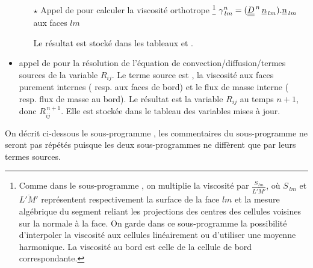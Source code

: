 \begin{itemize}
\begin{itemize}
\item [$\star$] Appel de  pour calculer la viscosité orthotrope
\footnote{Comme dans le sous-programme , on multiplie la viscosité par
$\displaystyle \frac{S_{\,lm}}{\overline{L'M'}}$, où $S_{\,lm}$ et
$\overline{L'M'}$ représentent respectivement la surface de la face $lm$ et la
mesure algébrique du segment reliant les projections des centres des cellules
voisines sur la normale à la face. On garde dans ce sous-programme  la possibilité d'interpoler la viscosité aux cellules linéairement ou d'utiliser une moyenne harmonique. La viscosité au bord est celle de la cellule de bord correspondante.}
$ \gamma^n_{\,lm} = (\underline{\underline{D}}^{\,n}\,\underline{n}_{\,lm}).\underline{n}_{\,lm}$ aux faces $lm$

Le résultat est stocké dans les tableaux  et .
\end{itemize}

\item appel de  pour la résolution de l'équation de
convection/diffusion/termes sources de la variable $R_{ij}$. Le terme source est
, la viscosité  aux faces purement internes (
resp.  aux faces de bord) et  le flux de masse interne
 ( resp.  flux de masse au bord). Le résultat est la variable $R_{ij}$ au temps
$n+1$, donc $R^{\,n+1}_{ij}$. Elle est stockée dans le tableau  des
variables mises à jour.

\end{itemize}


On décrit ci-dessous le sous-programme , les commentaires du sous-programme  ne seront pas répétés puisque les deux sous-programmes ne diffèrent que par leurs termes sources.

